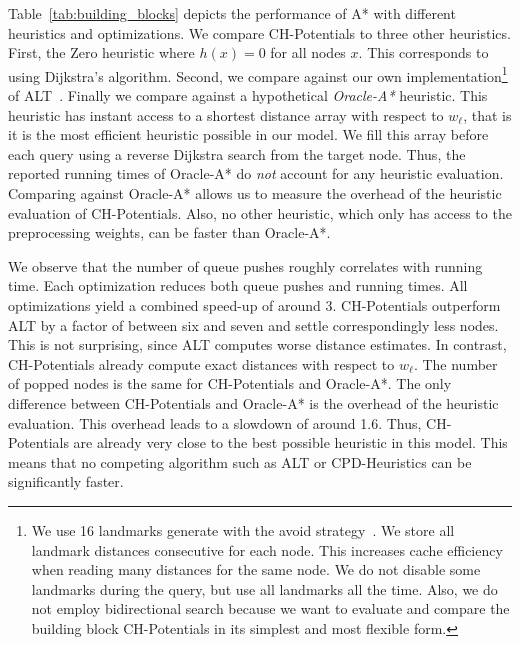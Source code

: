 \documentclass[a4paper,USenglish,cleveref, autoref, thm-restate]{lipics-v2019}
\begin{document}
Table~\ref{tab:building_blocks} depicts the performance of A* with different heuristics and optimizations.
We compare CH-Potentials to three other heuristics.
First, the Zero heuristic where $h(x)=0$ for all nodes $x$.
This corresponds to using Dijkstra's algorithm.
Second, we compare against our own implementation\footnote{
We use 16 landmarks generate with the avoid strategy~\cite{gw-cppsp-05}.
We store all landmark distances consecutive for each node.
This increases cache efficiency when reading many distances for the same node.
We do not disable some landmarks during the query, but use all landmarks all the time.
Also, we do not employ bidirectional search because we want to evaluate and compare the building block CH-Potentials in its simplest and most flexible form.
} of ALT~\cite{gw-cppsp-05}.
Finally we compare against a hypothetical \emph{Oracle-A*} heuristic.
This heuristic has instant access to a shortest distance array with respect to $w_\ell$, that is it is the most efficient heuristic possible in our model.
We fill this array before each query using a reverse Dijkstra search from the target node.
Thus, the reported running times of Oracle-A* do \emph{not} account for any heuristic evaluation.
Comparing against Oracle-A* allows us to measure the overhead of the heuristic evaluation of CH-Potentials.
Also, no other heuristic, which only has access to the preprocessing weights, can be faster than Oracle-A*.

We observe that the number of queue pushes roughly correlates with running time.
Each optimization reduces both queue pushes and running times.
All optimizations yield a combined speed-up of around 3.
CH-Potentials outperform ALT by a factor of between six and seven and settle correspondingly less nodes.
This is not surprising, since ALT computes worse distance estimates.
In contrast, CH-Potentials already compute exact distances with respect to $w_\ell$.
The number of popped nodes is the same for CH-Potentials and Oracle-A*.
The only difference between CH-Potentials and Oracle-A* is the overhead of the heuristic evaluation.
This overhead leads to a slowdown of around 1.6.
Thus, CH-Potentials are already very close to the best possible heuristic in this model.
This means that no competing algorithm such as ALT or CPD-Heuristics can be significantly faster.
\end{document}
